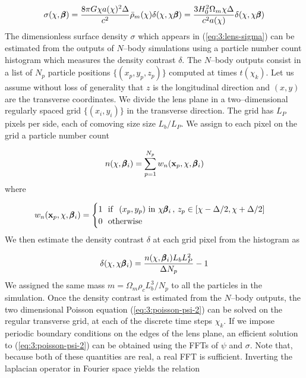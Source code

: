 \begin{equation}
\label{eq:3:lens-sigma}
\sigma(\chi,\pmb{\beta}) = \frac{8\pi G \chi a(\chi)^2\Delta}{c^2}\bar{\rho}_m(\chi)\delta(\chi,\chi\pmb{\beta}) = \frac{3H_0^2\Omega_m\chi\Delta}{c^2 a(\chi)}\delta(\chi,\chi\pmb{\beta})
\end{equation}
%
The dimensionless surface density $\sigma$ which appears in (\ref{eq:3:lens-sigma}) can be estimated from the outputs of $N$--body simulations using a particle number count histogram which measures the density contrast $\delta$. The $N$--body outputs consist in a list of $N_p$ particle positions $\{(x_p,y_p,z_p)\}$ computed at times $t(\chi_k)$. Let us assume without loss of generality that $z$ is the longitudinal direction and $(x,y)$ are the transverse coordinates. We divide the lens plane in a two--dimensional regularly spaced grid $\{(x_i,y_i)\}$ in the transverse direction. The grid has $L_P$ pixels per side, each of comoving size size $L_b/L_P$. We assign to each pixel on the grid a particle number count

\begin{equation}
\label{eq:3:number-hist}
n(\chi, \pmb{\beta}_i) = \sum_{p=1}^{N_p}w_n(\mathbf{x}_p,\chi,\pmb{\beta}_i)
\end{equation}  
%
where 

\begin{equation}
\label{eq:3:number-kernel}
w_n(\mathbf{x}_p,\chi,\pmb{\beta}_i) = 
\begin{cases}
1 \,\,\,\, {\rm if} \,\,\,\, (x_p,y_p) \,\, {\rm in} \,\, \chi\pmb{\beta}_i \, , \, z_p\in [\chi-\Delta/2,\chi+\Delta/2] \\
0 \,\,\,\, {\rm otherwise}
\end{cases}
\end{equation}
%
We then estimate the density contrast $\delta$ at each grid pixel from the histogram as

\begin{equation}
\label{eq:3:delta-hist}
\delta(\chi,\chi\pmb{\beta}_i) = \frac{n(\chi,\pmb{\beta}_i)L_bL_P^2 }{\Delta N_p} - 1
\end{equation}
%
We assigned the same mass $m=\Omega_m\rho_cL_b^3/N_p$ to all the particles in the simulation. Once the density contrast is estimated from the $N$--body outputs, the two dimensional Poisson equation (\ref{eq:3:poisson-psi-2}) can be solved on the regular transverse grid, at each of the discrete time steps $\chi_k$. If we impose periodic boundary conditions on the edges of the lens plane, an efficient solution to (\ref{eq:3:poisson-psi-2}) can be obtained using the FFTs of $\psi$ and $\sigma$. Note that, because both of these quantities are real, a real FFT is sufficient. Inverting the laplacian operator in Fourier space yields the relation

